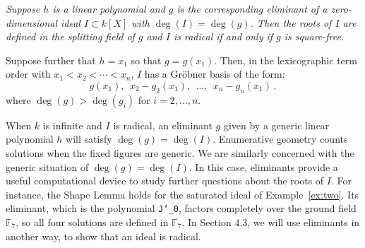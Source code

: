 {\it
Suppose $h$ is a linear polynomial and $g$ is the corresponding eliminant of
a zero-dimensional ideal $I\subset k[X]$ with $\deg(I)=\deg(g)$. 
Then the roots of $I$ are defined in the splitting
field of $g$ and  
$I$ is radical if and only if $g$ is square-free.

Suppose further that $h=x_1$ so that $g=g(x_1)$.
Then, in the lexicographic term order 
with $x_1<x_2<\cdots<x_n$, $I$ has a Gr\"obner basis of
the form: 
%
\begin{equation}\label{triangular}  
    g(x_1),\ \ x_2-g_2(x_1), \ \ \ldots,\ \ x_n-g_n(x_1)\,,
\end{equation}
%
where $\deg(g)>\deg(g_i)$ for $i=2,\ldots,n$.
}\medskip

When $k$ is infinite and $I$ is radical, an eliminant $g$ given by a generic
linear polynomial $h$ will satisfy $\deg(g)=\deg(I)$.
Enumerative geometry counts solutions
when the fixed figures are generic.
We are similarly concerned with the generic situation of 
$\deg(g)=\deg(I)$.
In this case, eliminants provide a useful computational device to study
further questions about the roots of $I$.
For instance, the Shape Lemma holds for the saturated ideal of Example~\ref{ex:two}.
Its eliminant, which is the polynomial {\tt J{\char`\_}0}, factors completely 
over the ground field ${\mathbb F}_7$, so all four solutions are defined
in ${\mathbb F}_7$.
In Section 4.3, we will use eliminants in another way, to show that
an ideal is radical. 

